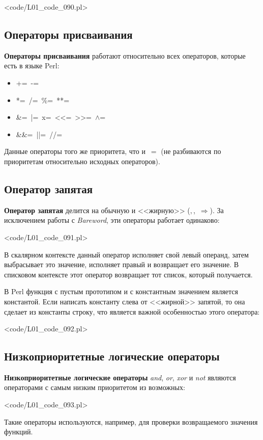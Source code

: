 \pr<code/L01_code_090.pl>

\subsection{Операторы присваивания}
\textbf{Операторы присваивания} работают относительно всех операторов, которые есть в языке Perl:

\begin{itemize}[nosep]
\item += -=
\item *= /= \%= **=
\item \&= |= x= <<= >>= $\wedge$=
\item \&\&= ||= //=
\end{itemize}

Данные операторы того же приоритета, что и~$=$ (не разбиваются по приоритетам относительно исходных операторов).

\subsection{Оператор запятая}
\textbf{Оператор запятая} делится на обычную и <<жирную>> ($,$,~$\Rightarrow$).
За исключением работы с \textit{Bareword}, эти операторы работает одинаково:

\pr<code/L01_code_091.pl>

В скалярном контексте данный оператор исполняет свой левый операнд, затем выбрасывает это значение, исполняет правый и возвращает его значение.
В списковом контексте этот оператор возвращает тот список, который получается.

В Perl функция с пустым прототипом и с константным значением является константой.
Если написать константу слева от <<жирной>> запятой, то она сделает из константы строку, что является важной особенностью этого оператора:

\pr<code/L01_code_092.pl>

\subsection{Низкоприоритетные логические операторы}
\textbf{Низкоприоритетные логические операторы} \textit{and}, \textit{or}, \textit{xor} и \textit{not} являются операторами с самым низким приоритетом из возможных:

\pr<code/L01_code_093.pl>

Такие операторы используются, например, для проверки возвращаемого значения функций.


